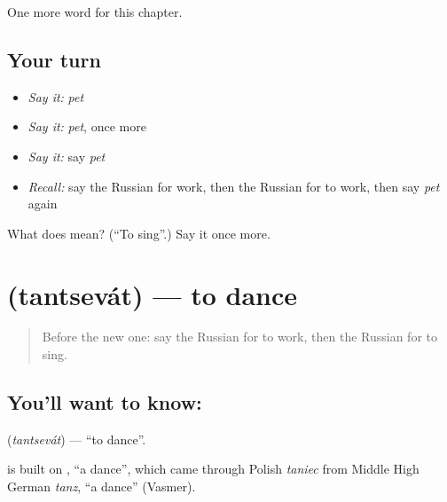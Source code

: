 \begin{grammarlens}[title={What you've built}]
One more word for this chapter.
\end{grammarlens}

\subsection*{Your turn}
\begin{itemize}
\raggedright
  \item \emph{Say it:} \emph{pet}
  \item \emph{Say it:} \emph{pet}, once more
  \item \emph{Say it:} say \emph{pet}
  \item \emph{Recall:} say the Russian for work, then the Russian for to work, then say \emph{pet} again
\end{itemize}

\begin{tcolorbox}[breakable,colback=teal!4,colframe=teal!35!black,title={Before you move on}]
What does  mean? (\textquotedblleft{}To sing\textquotedblright{}.) Say it once more.
\end{tcolorbox}
\section[\texorpdfstring{\ru{танцевать} (tantsevát)}{танцевать (tantsevát)}]{ (tantsevát) — to dance}

\label{lesson:RU-C38-tantsevat}



\begin{quote}
Before the new one: say the Russian for to work, then the Russian for to sing.
\end{quote}

\subsection*{You'll want to know: }
\textbf{} (\emph{tantsevát}) — \textquotedblleft{}to dance\textquotedblright{}.

\begin{cousinweb}
\textbf{} is built on \emph{}, \textquotedblleft{}a dance\textquotedblright{}, which came through Polish \emph{taniec} from Middle High German \emph{tanz}, \textquotedblleft{}a dance\textquotedblright{} (Vasmer).
\end{cousinweb}


